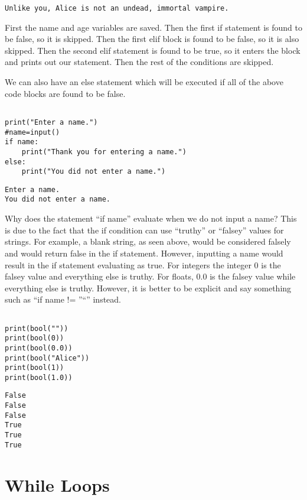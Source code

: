 \documentclass[11pt]{article}
\begin{document}
\begin{verbatim}
Unlike you, Alice is not an undead, immortal vampire.
\end{verbatim}


First the name and age variables are saved. Then the first if statement is found to be false, so it is skipped. Then the first elif block is found to be false, so it is also skipped. Then the second elif statement is found to be true, so it enters the block and prints out our statement. Then the rest of the conditions are skipped.

We can also have an else statement which will be executed if all of the above code blocks are found to be false.


\begin{verbatim}

print("Enter a name.")
#name=input()
if name:
    print("Thank you for entering a name.")
else:
    print("You did not enter a name.")
\end{verbatim}

\begin{verbatim}
Enter a name.
You did not enter a name.
\end{verbatim}


Why does the statement ``if name'' evaluate when we do not input a name? This is due to the fact that the if condition can use ``truthy'' or ``falsey'' values for strings. For example, a blank string, as seen above, would be considered falsely and would return false in the if statement. However, inputting a name would result in the if statement evaluating as true. For integers the integer 0 is the falsey value and everything else is truthy. For floats, 0.0 is the falsey value while everything else is truthy. However, it is better to be explicit and say something such as ``if name != ''``'' instead.


\begin{verbatim}

print(bool(""))
print(bool(0))
print(bool(0.0))
print(bool("Alice"))
print(bool(1))
print(bool(1.0))

\end{verbatim}

\begin{verbatim}
False
False
False
True
True
True
\end{verbatim}

\section{While Loops}
\label{sec:orgf72386b}
\end{document}
